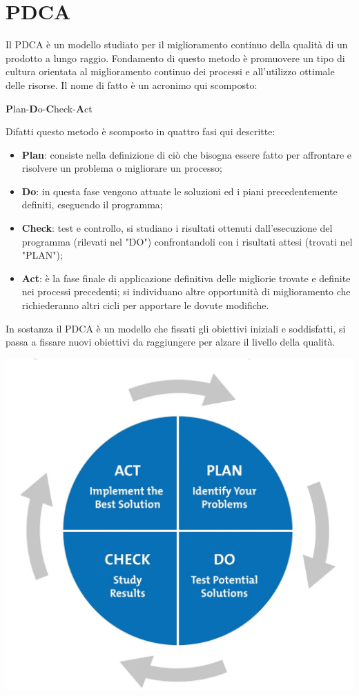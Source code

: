 \section{PDCA}
\label{pdca}
Il PDCA è un modello studiato per il miglioramento continuo della qualità di un prodotto a lungo raggio. Fondamento di questo metodo è promuovere un tipo di cultura orientata al miglioramento continuo dei processi e all'utilizzo ottimale delle risorse. Il nome di fatto è un acronimo qui scomposto:
\begin{center}
	\item \textbf{P}lan-\textbf{D}o-\textbf{C}heck-\textbf{A}ct
\end{center}
Difatti questo metodo è scomposto in quattro fasi qui descritte:
\begin{itemize}
	\item \textbf{Plan}: consiste nella definizione di ciò che bisogna essere fatto per affrontare e risolvere un problema o migliorare un processo;
	\item \textbf{Do}: in questa fase vengono attuate le soluzioni ed i piani precedentemente definiti, eseguendo il programma;
	\item \textbf{Check}: test e controllo, si studiano i risultati ottenuti dall'esecuzione del programma (rilevati nel "DO") confrontandoli con i risultati attesi (trovati nel "PLAN"); 
	\item \textbf{Act}: è la fase finale di applicazione definitiva delle migliorie trovate e definite nei processi precedenti; si individuano altre opportunità di miglioramento che richiederanno altri cicli per apportare le dovute modifiche.
\end{itemize}
In sostanza il PDCA è un modello che fissati gli obiettivi iniziali e soddisfatti, si passa a fissare nuovi obiettivi da raggiungere per alzare il livello della qualità.
\begin{center}
\item \includegraphics[scale=0.3]{./images/pdca.jpg} 
\end{center}
 